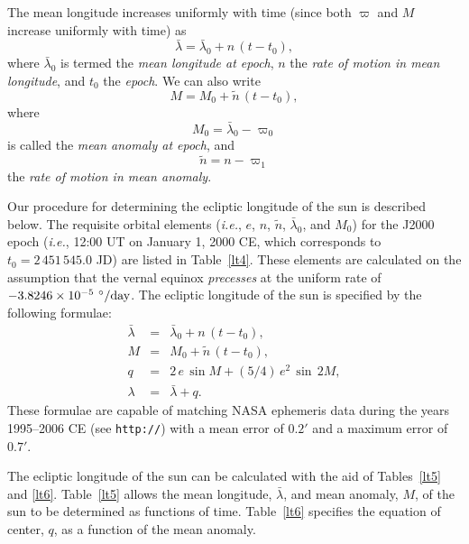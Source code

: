 The mean longitude increases
uniformly with time (since both $\varpi$ and $M$ increase uniformly with time) as
\begin{equation}\label{ae84}
\bar{\lambda} =  \bar{\lambda}_0+ n\,(t -t_0),
\end{equation}
where $\bar{\lambda}_0$ is termed the
{\em mean longitude at epoch}, 
$n$ the {\em rate of motion in mean longitude}, and $t_0$ the {\em epoch}. 
We can also write
\begin{equation}\label{ae85}
M = M_0 + \tilde{n}\,(t-t_0),
\end{equation}
where
\begin{equation}
M_0 = \bar{\lambda}_0 - \varpi_0
\end{equation}
is called the {\em mean anomaly at epoch}, and 
\begin{equation}\label{ae87}
\tilde{n} = n - \varpi_1
\end{equation}
 the {\em rate of motion in mean anomaly}. 

Our procedure for determining the ecliptic longitude of the sun is described
below. 
The requisite orbital elements ({\em i.e.}, $e$, $n$, $\tilde{n}$, $\bar{\lambda}_0$, and $M_0$) for the J2000 epoch ({\em i.e.}, 12:00 UT on January 1, 2000 CE, which corresponds to $t_0= 2\,451\,545.0$ JD) are listed
in Table~\ref{lt4}. These elements are calculated
on the assumption that the vernal equinox  {\em precesses}\/ at the uniform
rate of $-3.8246\times 10^{-5}\,\,^\circ/{\rm day}$. 
The ecliptic longitude of the sun is specified by the
following formulae:
\begin{eqnarray}
\bar{\lambda} &=&  \bar{\lambda}_0+ n\,(t-t_0),\\[0.5ex]
M &=& M_0 + \tilde{n}\,(t-t_0),\\[0.5ex]
q &=& 2\,e\,\sin M + (5/4)\,e^2\,\sin\,2M,\label{le2.8}\\[0.5ex]
\lambda &=& \bar{\lambda}  + q.
\end{eqnarray}
 These formulae are capable of matching NASA ephemeris data
during the years 1995--2006 CE (see {\tt http://}) with a mean error of $0.2'$ and a maximum error of $0.7'$. 

The ecliptic longitude of the sun can be calculated with the aid of Tables~\ref{lt5} and \ref{lt6}.
 Table~\ref{lt5} allows the mean longitude, $\bar{\lambda}$, and mean anomaly,
 $M$, of the
sun to be determined as  functions of time. Table~\ref{lt6} specifies the equation of center, $q$, as a
function of the mean anomaly. 

